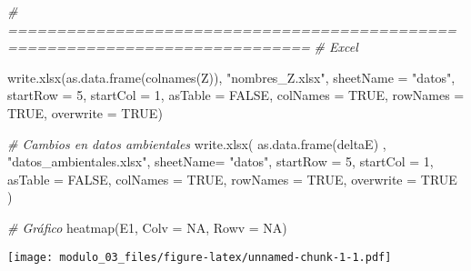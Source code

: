 \documentclass[
]{article}
\newenvironment{Shaded}{\begin{snugshade}}{\end{snugshade}}
\newcommand{\AttributeTok}[1]{\textcolor[rgb]{0.77,0.63,0.00}{#1}}
\newcommand{\CommentTok}[1]{\textcolor[rgb]{0.56,0.35,0.01}{\textit{#1}}}
\newcommand{\ConstantTok}[1]{\textcolor[rgb]{0.00,0.00,0.00}{#1}}
\newcommand{\DecValTok}[1]{\textcolor[rgb]{0.00,0.00,0.81}{#1}}
\newcommand{\FunctionTok}[1]{\textcolor[rgb]{0.00,0.00,0.00}{#1}}
\newcommand{\NormalTok}[1]{#1}
\newcommand{\StringTok}[1]{\textcolor[rgb]{0.31,0.60,0.02}{#1}}
\begin{document}
\begin{Shaded}
\begin{Highlighting}[]
\CommentTok{\# =============================================================================}
\CommentTok{\# Excel}

\FunctionTok{write.xlsx}\NormalTok{(}\FunctionTok{as.data.frame}\NormalTok{(}\FunctionTok{colnames}\NormalTok{(Z)),}
                         \StringTok{"nombres\_Z.xlsx"}\NormalTok{,}
                         \AttributeTok{sheetName =} \StringTok{"datos"}\NormalTok{,}
                         \AttributeTok{startRow =} \DecValTok{5}\NormalTok{,}
                         \AttributeTok{startCol =} \DecValTok{1}\NormalTok{,}
                         \AttributeTok{asTable =} \ConstantTok{FALSE}\NormalTok{,}
                         \AttributeTok{colNames =} \ConstantTok{TRUE}\NormalTok{,}
                         \AttributeTok{rowNames =} \ConstantTok{TRUE}\NormalTok{,}
                         \AttributeTok{overwrite =} \ConstantTok{TRUE}\NormalTok{)}

\CommentTok{\# Cambios en datos ambientales}
\FunctionTok{write.xlsx}\NormalTok{( }\FunctionTok{as.data.frame}\NormalTok{(deltaE) , }
            \StringTok{"datos\_ambientales.xlsx"}\NormalTok{,}
            \AttributeTok{sheetName=} \StringTok{"datos"}\NormalTok{,}
            \AttributeTok{startRow =} \DecValTok{5}\NormalTok{,}
            \AttributeTok{startCol =} \DecValTok{1}\NormalTok{,}
            \AttributeTok{asTable =} \ConstantTok{FALSE}\NormalTok{, }
            \AttributeTok{colNames =} \ConstantTok{TRUE}\NormalTok{, }
            \AttributeTok{rowNames =} \ConstantTok{TRUE}\NormalTok{, }
            \AttributeTok{overwrite =} \ConstantTok{TRUE}
\NormalTok{            )}

\CommentTok{\# Gráfico}
\FunctionTok{heatmap}\NormalTok{(E1, }\AttributeTok{Colv =} \ConstantTok{NA}\NormalTok{, }\AttributeTok{Rowv =} \ConstantTok{NA}\NormalTok{)}
\end{Highlighting}
\end{Shaded}

\texttt{[image: modulo\_03\_files/figure-latex/unnamed-chunk-1-1.pdf]}
\end{document}
